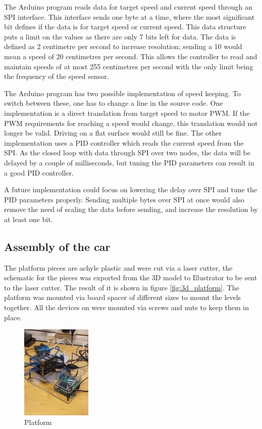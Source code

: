 \documentclass[11pt, titlepage]{article} %
\begin{document}
The Arduino program reads data for target speed and current speed through an SPI interface. This interface sends one byte at a time, where the most significant bit defines if the data is for target speed or current speed. This data structure puts a limit on the values as there are only 7 bits left for data. The data is defined as 2 centimetre per second to increase resolution; sending a 10 would mean a speed of 20 centimetres per second. This allows the controller to read and maintain speeds of at most 255 centimetres per second with the only limit being the frequency of the speed sensor. 

The Arduino program has two possible implementation of speed keeping. To switch between these, one has to change a line in the source code. One implementation is a direct translation from target speed to motor PWM. If the PWM requirements for reaching a speed would change, this translation would not longer be valid. Driving on a flat surface would still be fine. The other implementation uses a PID controller which reads the current speed from the SPI. As the closed loop with data through SPI over two nodes, the data will be delayed by a couple of milliseconds, but tuning the PID parameters can result in a good PID controller.

A future implementation could focus on lowering the delay over SPI and tune the PID parameters properly. Sending multiple bytes over SPI at once would also remove the need of scaling the data before sending, and increase the resolution by at least one bit.

\subsection{Assembly of the car}


The platform pieces are achyle plastic and were cut via a laser cutter, the schematic for the pieces was exported from the 3D model to Illustrator to be sent to the laser cutter. The result of it is shown in figure \ref{fig:3d_platform}. The platform was mounted via board spacer of different sizes to mount the levels together. All the devices on were mounted via screws and nuts to keep them in place. 


\begin{figure}
	\centering
	\includegraphics[width=0.3\textwidth]{platform_assembely.jpg}
	\caption{Platform}
	\label{fig:platform_ass}
\end{figure}
\end{document}
